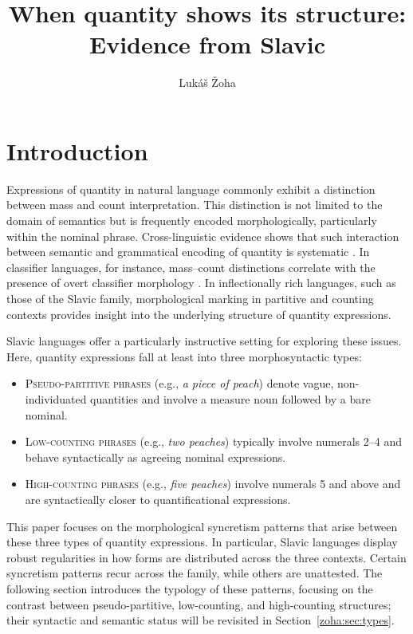 \documentclass[output=paper,colorlinks,citecolor=brown
]{langscibook}
\author{Lukáš Žoha\orcid{0000-0002-4736-195X}\affiliation{Masaryk University}
}
\title{When quantity shows its structure: Evidence from Slavic}
\begin{document}
\maketitle

%


\section{Introduction}

Expressions of quantity in natural language commonly exhibit a distinction between mass and count interpretation. This distinction is not limited to the domain of semantics but is frequently encoded morphologically, particularly within the nominal phrase. Cross-linguistic evidence shows that such interaction between semantic and grammatical encoding of quantity is systematic \citep{Doetjes2017}. In classifier languages, for instance, mass--count distinctions correlate with the presence of overt classifier morphology \citep{allan1977}. In inflectionally rich languages, such as those of the Slavic family, morphological marking in partitive and counting contexts provides insight into the underlying structure of quantity expressions.

Slavic languages offer a particularly instructive setting for exploring these issues. Here, quantity expressions fall at least into three morphosyntactic types: 

\begin{itemize}
  \item \textsc{Pseudo-partitive phrases} (e.g., \textit{a piece of peach}) denote vague, non-indivi\-duated quantities and involve a measure noun followed by a bare nominal.
  \item \textsc{Low-counting phrases} (e.g., \textit{two peaches}) typically involve numerals 2--4 and behave syntactically as agreeing nominal expressions.
  \item \textsc{High-counting phrases} (e.g., \textit{five peaches}) involve numerals 5 and above and are syntactically closer to quantificational expressions.
\end{itemize}

\noindent This paper focuses on the morphological syncretism patterns that arise between these three types of quantity expressions. In particular, Slavic languages display robust regularities in how forms are distributed across the three contexts. Certain syncretism patterns recur across the family, while others are unattested. The following section introduces the typology of these patterns, focusing on the contrast between pseudo-partitive, low-counting, and high-counting structures; their syntactic and semantic status will be revisited in Section~\ref{zoha:sec:types}.
\end{document}
